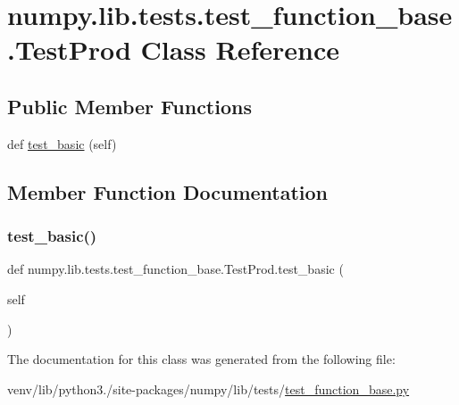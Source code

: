 \hypertarget{classnumpy_1_1lib_1_1tests_1_1test__function__base_1_1TestProd}{}\section{numpy.\+lib.\+tests.\+test\+\_\+function\+\_\+base.\+Test\+Prod Class Reference}
\label{classnumpy_1_1lib_1_1tests_1_1test__function__base_1_1TestProd}
\subsection*{Public Member Functions}
\begin{DoxyCompactItemize}
\item 
def \hyperlink{classnumpy_1_1lib_1_1tests_1_1test__function__base_1_1TestProd_a14a774cc49df57794c32509eecdefab5}{test\+\_\+basic} (self)
\end{DoxyCompactItemize}


\subsection{Member Function Documentation}
\mbox{\label{classnumpy_1_1lib_1_1tests_1_1test__function__base_1_1TestProd_a14a774cc49df57794c32509eecdefab5}} 
\subsubsection{\texorpdfstring{test\+\_\+basic()}{test\_basic()}}
{\footnotesize\ttfamily def numpy.\+lib.\+tests.\+test\+\_\+function\+\_\+base.\+Test\+Prod.\+test\+\_\+basic (\begin{DoxyParamCaption}\item[{}]{self }\end{DoxyParamCaption})}



The documentation for this class was generated from the following file\+:\begin{DoxyCompactItemize}
\item 
venv/lib/python3./site-\/packages/numpy/lib/tests/\hyperlink{lib_2tests_2test__function__base_8py}{test\+\_\+function\+\_\+base.\+py}\end{DoxyCompactItemize}
